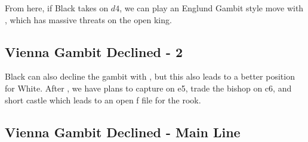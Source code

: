 \documentclass{article}
\begin{document}
 From here, if Black takes on $d4$, we can play an Englund Gambit style move with , which has massive threats on the open king.

\subsection{Vienna Gambit Declined - 2}
\newgame
{}
Black can also decline the gambit with , but this also leads to a better position for White.  After , we have plans to capture on e5, trade the bishop on c6, and short castle which leads to an open f file for the rook.
\begin{center}
\showboard
\end{center}
\subsection{Vienna Gambit Declined - Main Line}
\end{document}
